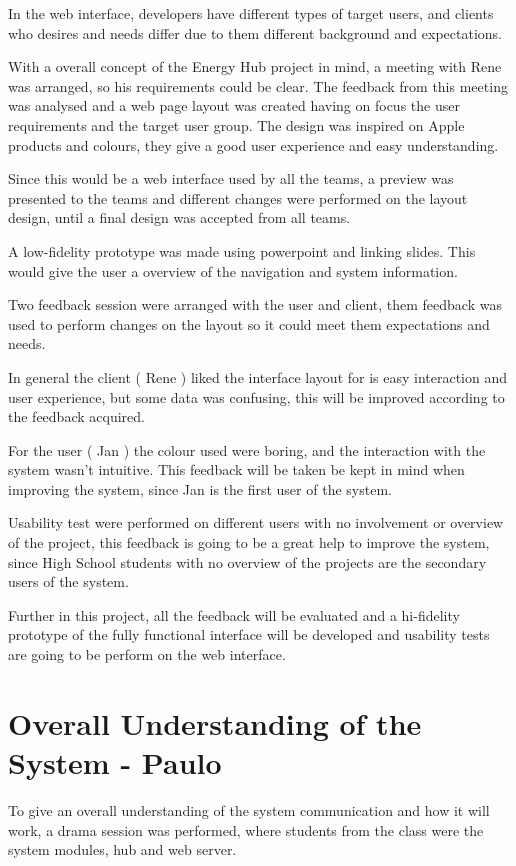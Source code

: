 In the web interface, developers have different types of target users, and clients who desires and needs differ due to them different background and expectations. 

With a overall concept of the Energy Hub project in mind, a meeting with Rene was arranged, so his requirements could be clear. The feedback from this meeting was analysed and a web page layout was created having on focus the user requirements and the target user group. The design was inspired on Apple products and colours, they give a good user experience and easy understanding.

Since this would be a web interface used by all the teams, a preview was presented to the teams and different changes were performed on the layout design, until a final design was accepted from all teams. 

A low-fidelity prototype was made using powerpoint and linking slides. This would give the user a overview of the navigation and system information.

Two feedback session were arranged with the user and client, them feedback was used to perform changes on the layout so it could meet them expectations and needs.

In general the client ( Rene ) liked the interface layout for is easy interaction and user experience, but some data was confusing, this will be improved according to the feedback acquired.

For the user ( Jan ) the colour used were boring, and the interaction with the system wasn't intuitive. This feedback will be taken be kept in mind when improving the system, since Jan is the first user of the system.

Usability test were performed on different users with no involvement or overview of the project, this feedback is going to be a great help to improve the system, since High School students with no overview of the projects are the secondary users of the system.

Further in this project, all the feedback will be evaluated and a hi-fidelity prototype of the fully functional interface will be developed and usability tests are going to be perform on the web interface.

\section{Overall Understanding of the System - Paulo} 

To give an overall understanding of the system communication and how it will work, a drama session was performed, where students from the class were the system modules, hub and web server.

